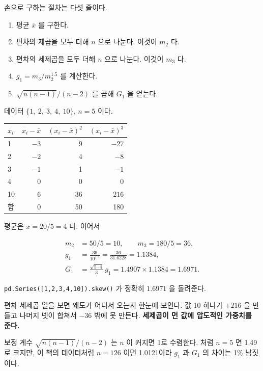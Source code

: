 손으로 구하는 절차는 다섯 줄이다.

\begin{enumerate}
  \item 평균 $\bar{x}$ 를 구한다.
  \item 편차의 제곱을 모두 더해 $n$ 으로 나눈다. 이것이 $m_2$ 다.
  \item 편차의 세제곱을 모두 더해 $n$ 으로 나눈다. 이것이 $m_3$ 다.
  \item $g_1 = m_3 / m_2^{1.5}$ 를 계산한다.
  \item $\sqrt{n(n-1)}/(n-2)$ 를 곱해 $G_1$ 을 얻는다.
\end{enumerate}

\begin{example}
\label{ex:skew-by-hand}
데이터 $\{1,\ 2,\ 3,\ 4,\ 10\}$, $n = 5$ 이다.

\begin{center}
\begin{tabular}{lrrr}
\toprule
$x_i$ & $x_i - \bar{x}$ & $(x_i-\bar{x})^2$ & $(x_i-\bar{x})^3$ \\
\midrule
1  & $-3$ & 9  & $-27$ \\
2  & $-2$ & 4  & $-8$  \\
3  & $-1$ & 1  & $-1$  \\
4  & $0$  & 0  & $0$   \\
10 & $6$  & 36 & $216$ \\
\midrule
합 & $0$ & 50 & 180 \\
\bottomrule
\end{tabular}
\end{center}

평균은 $\bar{x} = 20/5 = 4$ 다. 이어서

\begin{align*}
  m_2 &= 50/5 = 10, \qquad m_3 = 180/5 = 36, \\
  g_1 &= \frac{36}{10^{1.5}} = \frac{36}{31.6228} = 1.1384, \\
  G_1 &= \frac{\sqrt{5 \cdot 4}}{3}\, g_1 = 1.4907 \times 1.1384 = 1.6971 .
\end{align*}

\texttt{pd.Series([1,2,3,4,10]).skew()} 가 정확히 $1.6971$ 을 돌려준다.

편차 세제곱 열을 보면 왜도가 어디서 오는지 한눈에 보인다. 값 10 하나가 $+216$ 을
만들고 나머지 넷이 합쳐서 $-36$ 밖에 못 만든다. \textbf{세제곱이 먼 값에 압도적인
가중치를 준다.}
\end{example}

보정 계수 $\sqrt{n(n-1)}/(n-2)$ 는 $n$ 이 커지면 1로 수렴한다. 
처럼 $n=5$ 면 1.49로 크지만, 이 책의 데이터처럼 $n=126$ 이면 1.0121이라 $g_1$ 과 $G_1$ 의
차이는 1\% 남짓이다.

